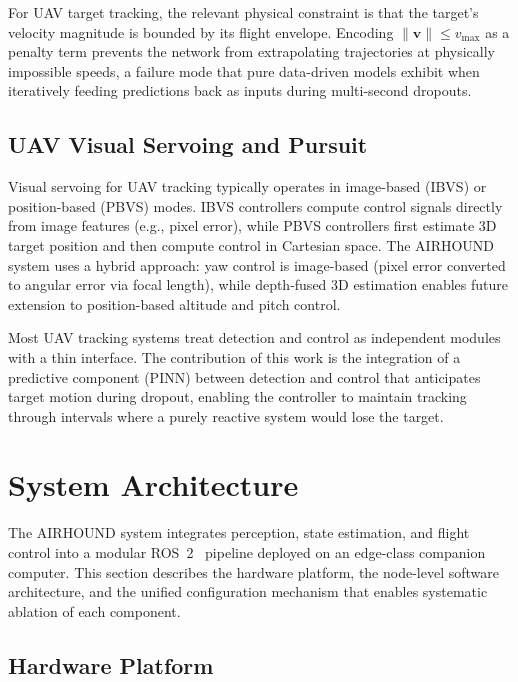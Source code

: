 \documentclass[11pt,letterpaper]{article}
\begin{document}
For UAV target tracking, the relevant physical constraint is that the target's velocity magnitude is bounded by its flight envelope. Encoding $\|\mathbf{v}\| \leq v_{\max}$ as a penalty term prevents the network from extrapolating trajectories at physically impossible speeds, a failure mode that pure data-driven models exhibit when iteratively feeding predictions back as inputs during multi-second dropouts.

\subsection{UAV Visual Servoing and Pursuit}

Visual servoing for UAV tracking typically operates in image-based (IBVS) or position-based (PBVS) modes. IBVS controllers compute control signals directly from image features (e.g., pixel error), while PBVS controllers first estimate 3D target position and then compute control in Cartesian space. The AIRHOUND system uses a hybrid approach: yaw control is image-based (pixel error converted to angular error via focal length), while depth-fused 3D estimation enables future extension to position-based altitude and pitch control.

Most UAV tracking systems treat detection and control as independent modules with a thin interface. The contribution of this work is the integration of a predictive component (PINN) between detection and control that anticipates target motion during dropout, enabling the controller to maintain tracking through intervals where a purely reactive system would lose the target.

\section{System Architecture}
\label{sec:architecture}

The AIRHOUND system integrates perception, state estimation, and
flight control into a modular ROS~2~\cite{ros2humble} pipeline
deployed on an edge-class companion computer.  This section describes
the hardware platform, the node-level software architecture, and the
unified configuration mechanism that enables systematic ablation of
each component.

\subsection{Hardware Platform}
\label{sec:hardware}
\end{document}
